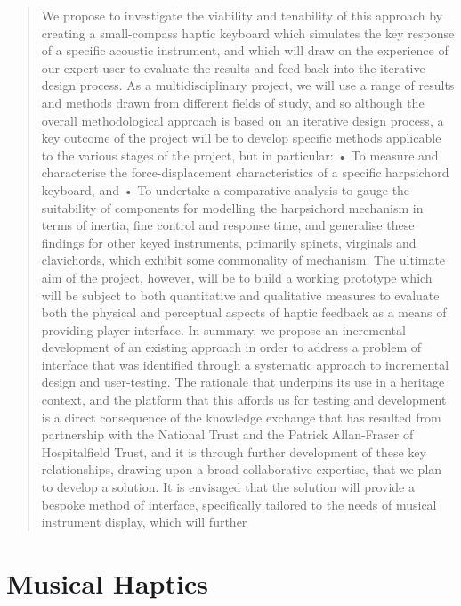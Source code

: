 \begin{quotation}
We propose to investigate the viability and tenability of this approach by creating a small-compass haptic keyboard which simulates the key response of a specific acoustic instrument, and which will draw on the experience of our expert user to evaluate the results and feed back into the iterative design process.
As a multidisciplinary project, we will use a range of results and methods drawn from different fields of study, and so although the overall methodological approach is based on an iterative design process, a key outcome of the project will be to develop specific methods applicable to the various stages of the project, but in particular:
• To measure and characterise the force-displacement characteristics of a specific harpsichord keyboard, and
• To undertake a comparative analysis to gauge the suitability of components for modelling the harpsichord mechanism in terms of inertia, fine control and response time, and generalise these findings for other keyed instruments, primarily spinets, virginals and clavichords, which exhibit some commonality of mechanism.
The ultimate aim of the project, however, will be to build a working prototype which will be subject to both quantitative and qualitative measures to evaluate both the physical and perceptual aspects of haptic feedback as a means of providing player interface.
In summary, we propose an incremental development of an existing approach in order to address a problem of interface that was identified through a systematic approach to incremental design and user-testing. The rationale that underpins its use in a heritage context, and the platform that this affords us for testing and development is a direct consequence of the knowledge exchange that has resulted from partnership with the National Trust and the Patrick Allan-Fraser of Hospitalfield Trust, and it is through further development of these key relationships, drawing upon a broad collaborative expertise, that we plan to develop a solution. It is envisaged that the solution will provide a bespoke method of interface, specifically tailored to the needs of musical instrument display, which will further
\end{quotation}



\section{Musical Haptics}


\section{\cite{papetti_haptics_2018}}

